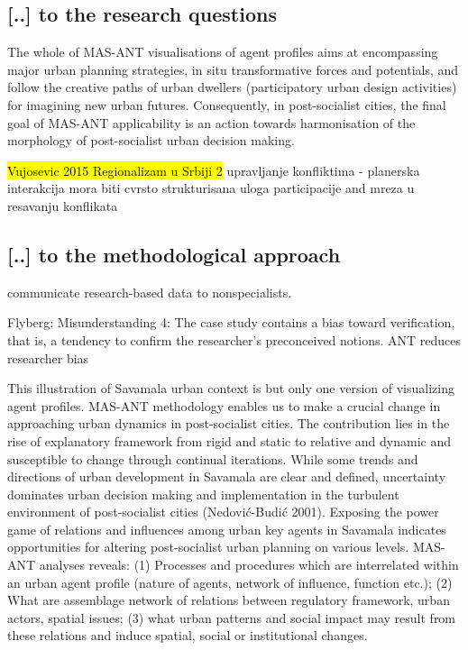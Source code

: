 \documentclass[11pt]{report}
\begin{document}
\subsection{[..] to the research questions}

The whole of MAS-ANT visualisations of agent profiles aims at encompassing major urban planning strategies, in situ transformative forces and potentials, and follow the creative paths of urban dwellers (participatory urban design activities) for imagining new urban futures. Consequently, in post-socialist cities, the final goal of MAS-ANT applicability is an action towards harmonisation of the morphology of post-socialist urban decision making.

\hl{Vujosevic 2015 Regionalizam u Srbiji 2}
upravljanje konfliktima - planerska interakcija mora biti cvrsto strukturisana
uloga participacije and mreza u resavanju konflikata

\subsection{[..] to the methodological approach}

communicate research-based data to nonspecialists.

Flyberg: 
Misunderstanding 4: The case study contains a bias toward verification, that is, a tendency to confirm the researcher's preconceived notions.
ANT reduces researcher bias

This illustration of Savamala urban context is but only one version of visualizing agent profiles. MAS-ANT methodology enables us to make a crucial change in approaching urban dynamics in post-socialist cities. The contribution lies in the rise of explanatory framework from rigid and static to relative and dynamic and susceptible to change through continual iterations. While some trends and directions of urban development in Savamala are clear and defined, uncertainty dominates urban decision making and implementation in the turbulent environment of post-socialist cities (Nedović-Budić 2001). Exposing the power game of relations and influences among urban key agents in Savamala indicates opportunities for altering post-socialist urban planning on various levels. MAS-ANT analyses reveals: 
(1)	Processes and procedures which are interrelated within an urban agent profile (nature of agents, network of influence, function etc.);
(2)	What are assemblage network of relations between regulatory framework, urban actors, spatial issues;
(3)	what  urban  patterns  and  social  impact  may result  from  these  relations  and  induce  spatial,  social  or institutional changes.
\end{document}
